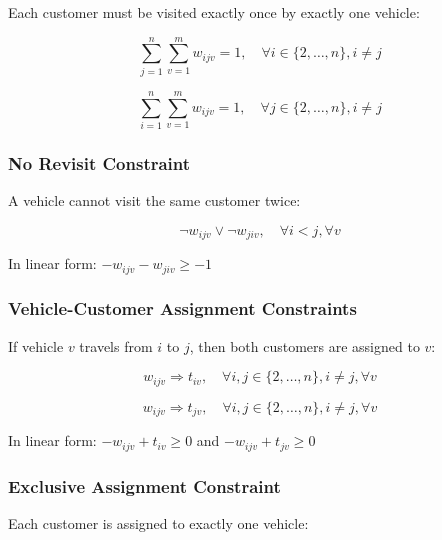 \documentclass[12pt,a4paper]{article}
\theoremstyle{definition}
\begin{document}
Each customer must be visited exactly once by exactly one vehicle:

\begin{equation}
\sum_{j=1}^{n} \sum_{v=1}^{m} w_{ijv} = 1, \quad \forall i \in \{2, \ldots, n\}, i \neq j \tag{C3: One exit}
\end{equation}

\begin{equation}
\sum_{i=1}^{n} \sum_{v=1}^{m} w_{ijv} = 1, \quad \forall j \in \{2, \ldots, n\}, i \neq j \tag{C4: One entry}
\end{equation}

\subsubsection{No Revisit Constraint}

A vehicle cannot visit the same customer twice:

\begin{equation}
\neg w_{ijv} \vee \neg w_{jiv}, \quad \forall i < j, \forall v \tag{C5: No back-and-forth}
\end{equation}

In linear form: $-w_{ijv} - w_{jiv} \geq -1$

\subsubsection{Vehicle-Customer Assignment Constraints}

If vehicle $v$ travels from $i$ to $j$, then both customers are assigned to $v$:

\begin{equation}
w_{ijv} \Rightarrow t_{iv}, \quad \forall i, j \in \{2, \ldots, n\}, i \neq j, \forall v \tag{C6}
\end{equation}

\begin{equation}
w_{ijv} \Rightarrow t_{jv}, \quad \forall i, j \in \{2, \ldots, n\}, i \neq j, \forall v \tag{C7}
\end{equation}

In linear form: $-w_{ijv} + t_{iv} \geq 0$ and $-w_{ijv} + t_{jv} \geq 0$

\subsubsection{Exclusive Assignment Constraint}

Each customer is assigned to exactly one vehicle:
\end{document}
